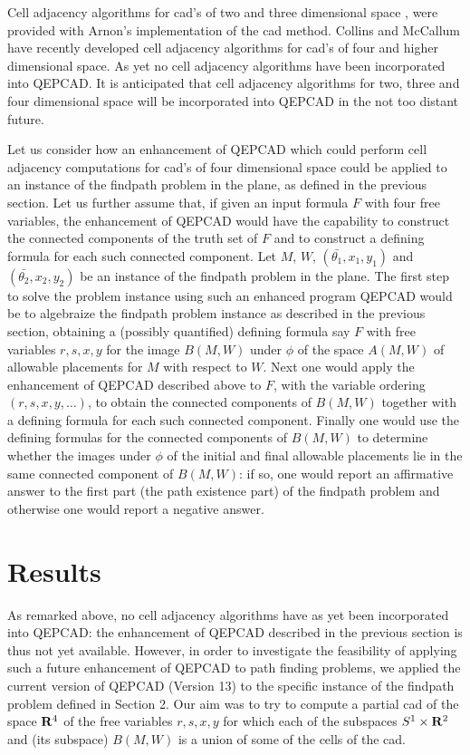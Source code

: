 Cell adjacency algorithms for cad's of two and three dimensional space
\cite{Arnon_Collins_McCallum:84b}, \cite{Arnon_Collins_McCallum:88}
were provided with Arnon's implementation of the cad method.
Collins and McCallum \cite{Collins_McCallum:95} have recently
developed cell adjacency algorithms for cad's of four and
higher dimensional space. As yet no cell adjacency algorithms
have been incorporated into QEPCAD.
It is anticipated that cell adjacency algorithms for two, three and four
dimensional space will be incorporated into QEPCAD in the not too distant
future.

Let us consider how an enhancement of QEPCAD which could perform
cell adjacency computations for cad's of four dimensional space
could be applied to an instance of the findpath problem in the
plane, as defined in the previous section.
Let us further assume that, if given an input formula
$F$ with four free variables, the enhancement of QEPCAD
would have the capability to construct the connected components
of the truth set of $F$ and to construct a defining formula for
each such connected component.
Let $M$, $W$, $(\bar{\theta _{1}}, x_{1}, y_{1})$
and $(\bar{\theta _{2}},x_{2}, y_{2})$ be an instance of
the findpath problem in the plane.
The first step to solve the
problem instance using such an enhanced program QEPCAD 
would be to algebraize the findpath problem
instance as described in the previous section,
obtaining a (possibly quantified) defining formula say $F$
with free variables $r, s, x, y$
for the image $B(M,W)$ under $\phi$ of the space $A(M,W)$ of
allowable placements for $M$ with respect to $W$.
Next one would apply the enhancement of QEPCAD described above
to $F$, with the variable ordering $(r, s, x, y, \ldots )$,
to obtain the connected components of $B(M,W)$ together with
a defining formula for each such connected component.
Finally one would use the defining formulas for the connected
components of $B(M,W)$ to determine whether the images under $\phi$
of the initial and final allowable placements lie in the same connected
component of $B(M,W)$: if so, one would report an affirmative
answer to the first part (the path existence part) of the findpath
problem and otherwise one would report a negative answer.

\section{Results}
As remarked above, no cell adjacency algorithms have as yet
been incorporated into QEPCAD: the enhancement of QEPCAD
described in the previous section is thus not yet available.
However, in order to investigate the feasibility of applying
such a future enhancement of QEPCAD to path finding problems,
we applied the current version of QEPCAD (Version 13)
to the specific instance of the findpath problem defined
in Section 2. Our aim was to try to compute a partial cad
of the space ${\bf R}^{4}$ of the free variables $r, s, x, y$
for which each of the subspaces $S^{1} \times {\bf R}^{2}$
and (its subspace) $B(M,W)$ is a union of some of the cells
of the cad.

